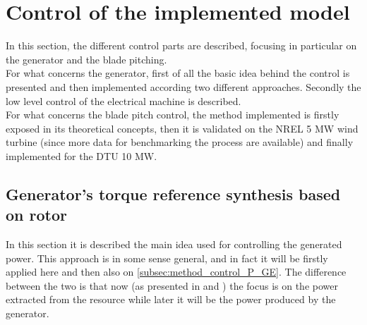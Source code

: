 \newpage
\section{Control of the implemented model}\label{sec:c_basic_model_control}
In this section, the different control parts are described, focusing in particular on the generator and the blade pitching. \\
For what concerns the generator, first of all the basic idea behind the control is presented and then implemented according two different approaches. Secondly the low level control of the electrical machine is described.\\
For what concerns the blade pitch control, the method implemented is firstly exposed in its theoretical concepts, then it is validated on the NREL 5 MW wind turbine (since more data for benchmarking the process are available) and finally implemented for the DTU 10 MW.   

\subsection{Generator's torque reference synthesis based on rotor}\label{subsec:torque_reference}
In this section it is described the main idea used for controlling the generated power. This approach is in some sense general, and in fact it will be firstly applied here and then also on \autoref{subsec:method_control_P_GE}. The difference between the two is that now (as presented in \cite{Aerodynamics_of_wind_turbines} and \cite{SMILDEN2016386}) the focus is on the power extracted from the resource while later it will be the power produced by the generator.

